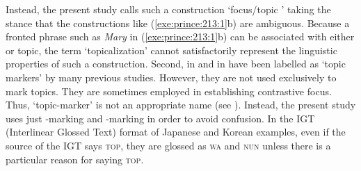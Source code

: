 \noindent Instead, the present study calls such a construction
`focus/topic ' taking the stance that the constructions
like (\ref{exe:prince:213:1}b) are ambiguous. Because a fronted phrase
such as \textit{Mary} in (\ref{exe:prince:213:1}b) can be associated
with either  or topic, the term `topicalization' cannot
satisfactorily represent the linguistic properties of such a
construction.  Second, \wa in  and \nun in 
have been labelled as `topic markers' by many previous
studies. However, they are not used exclusively to mark topics. They
are sometimes employed in establishing contrastive focus.
Thus, `topic-marker' is not an appropriate name (see
 ).  Instead, the present study uses
just \wa-marking and \nun-marking in order to avoid confusion. In the
IGT (Interlinear Glossed Text) format of Japanese and Korean examples,
even if the source of the IGT says \textsc{top}, they are glossed as
\textsc{wa} and \textsc{nun} unless there is a particular reason for
saying \textsc{top}.






